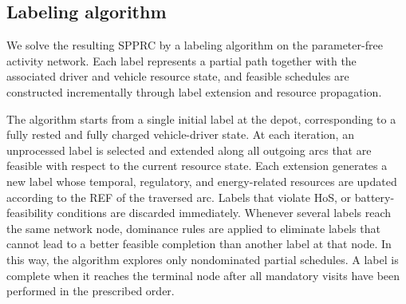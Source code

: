 \documentclass[3p,11pt,authoryear]{elsarticle}  %
\begin{document}

\subsection{Labeling algorithm}

We solve the resulting SPPRC by a labeling algorithm on the parameter-free activity network. Each label represents a partial path together with the associated driver and vehicle resource state, and feasible schedules are constructed incrementally through label extension and resource propagation.

The algorithm starts from a single initial label at the depot, corresponding to a fully rested and fully charged vehicle-driver state. At each iteration, an unprocessed label is selected and extended along all outgoing arcs that are feasible with respect to the current resource state. Each extension generates a new label whose temporal, regulatory, and energy-related resources are updated according to the REF of the traversed arc. Labels that violate HoS, or battery-feasibility conditions are discarded immediately. Whenever several labels reach the same network node, dominance rules are applied to eliminate labels that cannot lead to a better feasible completion than another label at that node. In this way, the algorithm explores only nondominated partial schedules. A label is complete when it reaches the terminal node after all mandatory visits have been performed in the prescribed order.
\end{document}
